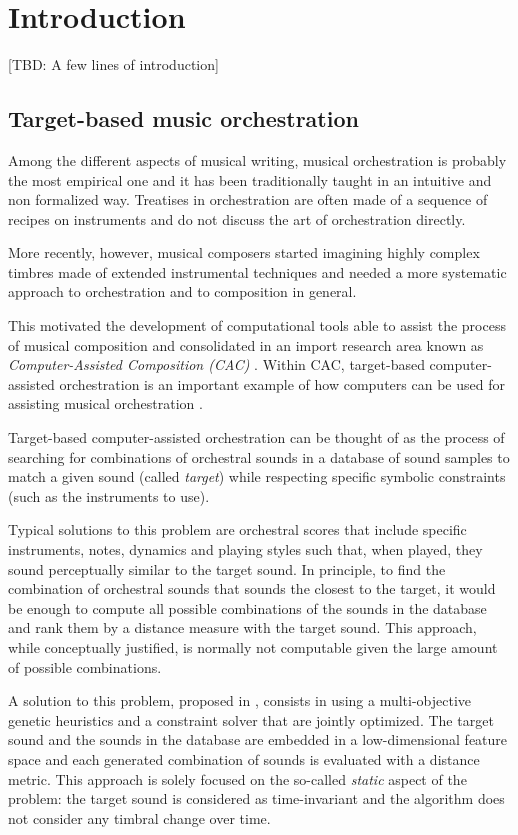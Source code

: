 \documentclass[a4paper]{book}
\begin{document}
\section{Introduction}\label{sec:introduction}

[TBD: A few lines of introduction]

\subsection{Target-based music orchestration}\label{sec:tbmo}

Among the different aspects of musical writing, musical orchestration is probably the most empirical one and it has been traditionally taught in an intuitive and non formalized way. Treatises in orchestration are often made of a sequence of recipes on instruments and do not discuss the art of orchestration directly.

More recently, however, musical composers started imagining highly complex timbres made of extended instrumental techniques and needed a more systematic approach to orchestration and to composition in general. 

This motivated the development of computational tools able to assist the process of musical composition and consolidated in an import research area known as \emph{Computer-Assisted Composition (CAC)} \cite{Fernandez2013, Ariza2005}. Within CAC, target-based computer-assisted orchestration is an important example of how computers can be used for {assisting} musical orchestration \cite{Maresz2013}. 

Target-based computer-assisted orchestration can be thought of as the process of searching for combinations of orchestral sounds in a database of sound samples to match a given sound (called \emph{target}) while respecting specific symbolic constraints (such as the instruments to use).

Typical solutions to this problem are orchestral scores that include specific instruments, notes, dynamics and playing styles such that, when played, they sound perceptually similar to the target sound. In principle, to find the combination of orchestral sounds that sounds the closest to the target, it would be enough to compute all possible combinations of the sounds in the database and rank them by a distance measure with the target sound. This approach, while conceptually justified, is normally not computable given the large amount of possible combinations.

A solution to this problem, proposed in \cite{Carpentier2007}, consists in using a multi-objective genetic heuristics and a constraint solver that are jointly optimized. The target sound and the sounds in the database are embedded in a low-dimensional feature space and each generated combination of sounds is evaluated with a distance metric. 
This approach is solely focused on the so-called \emph{static} aspect of the problem: the target sound is considered as time-invariant and the algorithm does not consider any timbral change over time.
\end{document}
